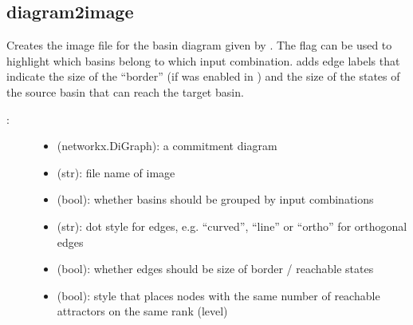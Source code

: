 \documentclass[letterpaper,10pt,english]{sphinxmanual}
\begin{document}
\subsection{diagram2image}
\label{\detokenize{Commitment:diagram2image}}\label{\detokenize{Commitment:commitment-diagram2image}}

\begin{fulllineitems}
\label{\detokenize{Commitment:PyBoolNet.Commitment.diagram2image}}
Creates the image file  for the basin diagram given by .
The flag  can be used to highlight which basins belong to which input combination.
 adds edge labels that indicate the size of the “border” (if  was enabled in {\hyperref[\detokenize{Commitment:commitment-compute-diagram}]{}})
and the size of the states of the source basin that can reach the target basin.
\begin{description}
\item[{:}] \leavevmode\begin{itemize}
\item {} 
 (networkx.DiGraph): a commitment diagram

\item {} 
 (str): file name of image

\item {} 
 (bool): whether basins should be grouped by input combinations

\item {} 
 (str): dot style for edges, e.g. “curved”, “line” or “ortho” for orthogonal edges

\item {} 
 (bool): whether edges should be size of border / reachable states

\item {} 
 (bool): style that places nodes with the same number of reachable attractors on the same rank (level)


\end{itemize}
\end{description}
\end{fulllineitems}
\end{document}
